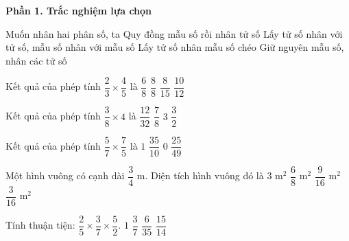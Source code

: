 \textbf{Phần 1. Trắc nghiệm lựa chọn}

\begin{ex} %
Muốn nhân hai phân số, ta
\choice
{Quy đồng mẫu số rồi nhân tử số}
{\True Lấy tử số nhân với tử số, mẫu số nhân với mẫu số}
{Lấy tử số nhân mẫu số chéo}
{Giữ nguyên mẫu số, nhân các tử số}
\end{ex}

\begin{ex} %
Kết quả của phép tính $\dfrac{2}{3} \times \dfrac{4}{5}$ là
\choice
{$\dfrac{6}{8}$}
{$\dfrac{8}{8}$}
{\True $\dfrac{8}{15}$}
{$\dfrac{10}{12}$}
\end{ex}

\begin{ex} %
Kết quả của phép tính $\dfrac{3}{8} \times 4$ là
\choice
{$\dfrac{12}{32}$}
{$\dfrac{7}{8}$}
{$3$}
{\True $\dfrac{3}{2}$}
\end{ex}

\begin{ex} %
Kết quả của phép tính $\dfrac{5}{7} \times \dfrac{7}{5}$ là
\choice
{\True $1$}
{$\dfrac{35}{10}$}
{$0$}
{$\dfrac{25}{49}$}
\end{ex}

\begin{ex} %
Một hình vuông có cạnh dài $\dfrac{3}{4}\text{ m}$. Diện tích hình vuông đó là
\choice
{$3\text{ m}^2$}
{$\dfrac{6}{8}\text{ m}^2$}
{\True $\dfrac{9}{16}\text{ m}^2$}
{$\dfrac{3}{16}\text{ m}^2$}
\end{ex}

\begin{ex} %
Tính thuận tiện: $\dfrac{2}{5} \times \dfrac{3}{7} \times \dfrac{5}{2}$.
\choice
{$1$}
{\True $\dfrac{3}{7}$}
{$\dfrac{6}{35}$}
{$\dfrac{15}{14}$}
\end{ex}

